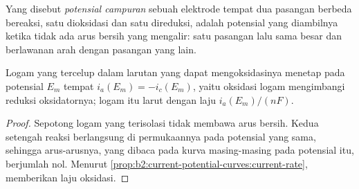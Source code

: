 \begin{definition}\label{def:b2:batteries-electrolysis:mixed-potential}
Yang disebut \emph{potensial campuran} sebuah
elektrode tempat dua pasangan berbeda bereaksi, satu dioksidasi dan satu
direduksi, adalah potensial yang diambilnya ketika tidak ada arus bersih
yang mengalir:  satu pasangan lalu sama besar dan berlawanan
arah dengan  pasangan yang lain.
\end{definition}

\begin{proposition}\label{prop:b2:batteries-electrolysis:mixed}
Logam yang tercelup dalam larutan yang dapat mengoksidasinya menetap pada
potensial $E_m$ tempat $i_a(E_m) = -i_c(E_m)$, yaitu  oksidasi
logam mengimbangi  reduksi oksidatornya; logam itu larut
dengan laju $i_a(E_m)/(nF)$.
\end{proposition}

\begin{proof}
Sepotong logam yang terisolasi tidak membawa arus bersih. Kedua setengah
reaksi berlangsung di permukaannya pada potensial yang sama, sehingga
arus-arusnya, yang dibaca pada kurva masing-masing pada potensial itu,
berjumlah nol. Menurut \cref{prop:b2:current-potential-curves:current-rate},
 memberikan laju oksidasi.
\end{proof}

